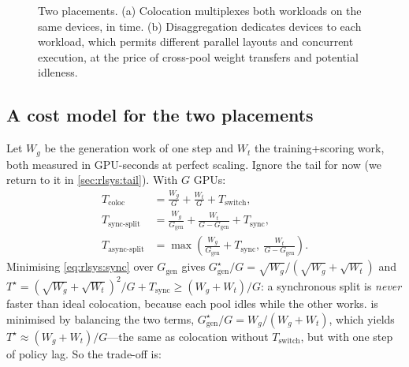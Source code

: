 \begin{figure}[t]
\centering
{}
\caption{Two placements. (a) Colocation multiplexes both workloads on the same devices, in
time. (b) Disaggregation dedicates devices to each workload, which permits different
parallel layouts and concurrent execution, at the price of cross-pool weight transfers and
potential idleness.}
\label{fig:rlsys:placement}
\end{figure}

\subsection{A cost model for the two placements}

Let $W_g$ be the generation work of one step and $W_t$ the training+scoring work, both measured
in GPU-seconds at perfect scaling. Ignore the tail for now (we return to it in
\cref{sec:rlsys:tail}). With $G$ GPUs:
\begin{align}
T_{\text{coloc}} &= \frac{W_g}{G} + \frac{W_t}{G} + T_{\text{switch}},\label{eq:rlsys:coloc}\\
T_{\text{sync-split}} &= \frac{W_g}{G_{\text{gen}}} + \frac{W_t}{G - G_{\text{gen}}} + T_{\text{sync}},\label{eq:rlsys:sync}\\
T_{\text{async-split}} &= \max\!\left(\frac{W_g}{G_{\text{gen}}} + T_{\text{sync}},\ \frac{W_t}{G - G_{\text{gen}}}\right).\label{eq:rlsys:async}
\end{align}
Minimising \cref{eq:rlsys:sync} over $G_{\text{gen}}$ gives
$G_{\text{gen}}^\star/G = \sqrt{W_g}/(\sqrt{W_g}+\sqrt{W_t})$ and
$T^\star = (\sqrt{W_g}+\sqrt{W_t})^2/G + T_{\text{sync}} \ge (W_g+W_t)/G$: a synchronous split
is \emph{never} faster than ideal colocation, because each pool idles while the other works.
 is minimised by balancing the two terms,
$G_{\text{gen}}^\star/G = W_g/(W_g+W_t)$, which yields $T^\star \approx (W_g+W_t)/G$---the same as
colocation without $T_{\text{switch}}$, but with one step of policy lag. So the trade-off is:


